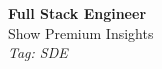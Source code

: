 \documentclass[11pt]{article}
\begin{document}
\begin{center}
  {\LARGE \textbf{Full Stack Engineer}} \\[4pt]
  {\large Show Premium Insights} \\[2pt]
  {\small \textit{Tag: SDE}}
\end{center}

\vspace{1em}
\noindent
\end{document}
